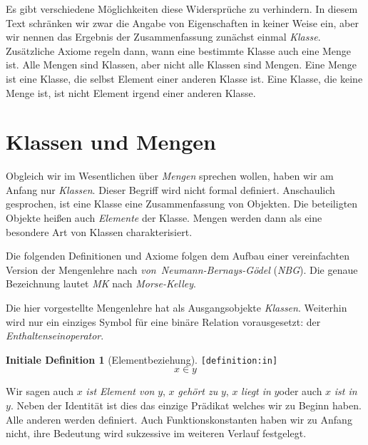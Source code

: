 \documentclass[a4paper,german,10pt,twoside]{book}
\theoremstyle{definition}
\newtheorem{idefn}[defn]{Initiale Definition}
\theoremstyle{remark}
\begin{document}
\par
Es gibt verschiedene M{\"o}glichkeiten diese Widerspr{\"u}che zu verhindern. In diesem Text schr{\"a}nken wir zwar die Angabe von Eigenschaften in keiner Weise ein, aber wir nennen das Ergebnis der Zusammenfassung zun{\"a}chst einmal \emph{Klasse}. Zus{\"a}tzliche Axiome regeln dann, wann eine bestimmte Klasse auch eine Menge ist. Alle Mengen sind Klassen, aber nicht alle Klassen sind Mengen. Eine Menge ist eine Klasse, die selbst Element einer anderen Klasse ist. Eine Klasse, die keine Menge ist, ist nicht Element irgend einer anderen Klasse.

\section{Klassen und Mengen} \label{chapter3_section1} \hypertarget{chapter3_section1}{}
Obgleich wir im Wesentlichen {\"u}ber \emph{Mengen} sprechen wollen, haben wir am Anfang nur \emph{Klassen}. Dieser Begriff wird nicht formal definiert. Anschaulich gesprochen, ist eine Klasse eine Zusammenfassung von Objekten. Die beteiligten Objekte hei{\ss}en auch \emph{Elemente} der Klasse.
Mengen werden dann als eine besondere Art von Klassen charakterisiert.

\par
Die folgenden Definitionen und Axiome folgen dem Aufbau einer vereinfachten Version der Mengenlehre nach \emph{von~Neumann-Bernays-G{\"o}del} (\emph{NBG}). Die genaue Bezeichnung lautet \emph{MK} nach \emph{Morse-Kelley}.

\par
Die hier vorgestellte Mengenlehre hat als Ausgangsobjekte \emph{Klassen}.
Weiterhin wird nur ein einziges Symbol f{\"u}r eine bin{\"a}re Relation vorausgesetzt: der \emph{Enthaltenseinoperator}.

\begin{idefn}[Elementbeziehung]
\label{definition:in} \hypertarget{definition:in}{}
{\tt \tiny [\verb]definition:in]]}
$$x \in y
$$

\end{idefn}

Wir sagen auch \glqq$x$ \emph{ist Element von} $y$\grqq, \glqq$x$ \emph{geh{\"o}rt zu} $y$\grqq, \glqq$x$ \emph{liegt in} $y$\grqq oder auch \glqq$x$ \emph{ist in} $y$\grqq.
Neben der Identit{\"a}t ist dies das einzige Pr{\"a}dikat welches wir zu Beginn haben. Alle anderen werden definiert. Auch Funktionskonstanten haben wir zu Anfang nicht, ihre Bedeutung wird sukzessive im weiteren Verlauf festgelegt.
\end{document}
